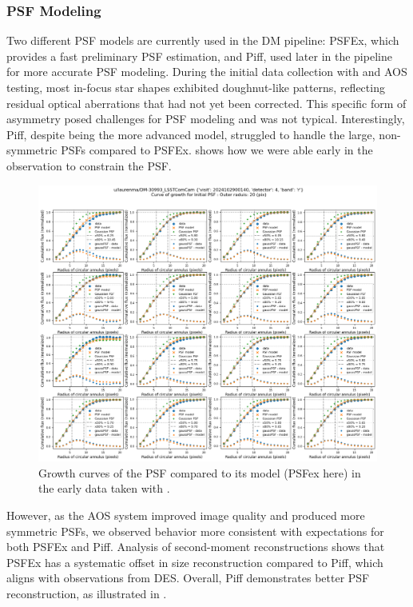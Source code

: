 \subsubsection{PSF Modeling}

Two different PSF models are currently used in the DM pipeline: PSFEx, which provides a fast preliminary PSF estimation, and Piff, used later in the pipeline for more accurate PSF modeling. During the initial data collection with \ComCam and AOS testing, most in-focus star shapes exhibited doughnut-like patterns, reflecting residual optical aberrations that had not yet been corrected. This specific form of asymmetry posed challenges for PSF modeling and was not typical. Interestingly, Piff, despite being the more advanced model, struggled to handle the large, non-symmetric PSFs compared to PSFEx.  shows how we were able early in the observation to constrain the PSF.


\begin{figure}
        \centering
        \includegraphics[scale=0.2]{figures/curveOfGrowth_pfsex_u_laurenma_DM-30993_LSSTComCam_2024102900140_4}
        \caption{\small Growth curves of the PSF compared to its model (PSFex here)  in the early data taken with \ComCam. }
        \label{fig:growth_plot}
\end{figure}



However, as the AOS system improved image quality and produced more symmetric PSFs, we observed behavior more consistent with expectations for both PSFEx and Piff. 
Analysis of second-moment reconstructions shows that PSFEx has a systematic offset in size reconstruction compared to Piff, which aligns with observations from DES. Overall, Piff demonstrates better PSF reconstruction, as illustrated in . 

